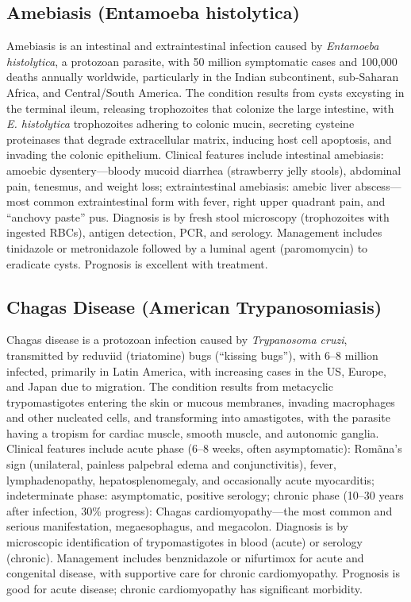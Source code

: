 \subsection{Amebiasis (Entamoeba histolytica)}
\label{sec:Amebiasis}
Amebiasis is an intestinal and extraintestinal infection caused by \textit{Entamoeba histolytica}, a protozoan parasite, with 50 million symptomatic cases and 100,000 deaths annually worldwide, particularly in the Indian subcontinent, sub-Saharan Africa, and Central/South America. The condition results from cysts excysting in the terminal ileum, releasing trophozoites that colonize the large intestine, with \textit{E. histolytica} trophozoites adhering to colonic mucin, secreting cysteine proteinases that degrade extracellular matrix, inducing host cell apoptosis, and invading the colonic epithelium. Clinical features include intestinal amebiasis: amoebic dysentery---bloody mucoid diarrhea (strawberry jelly stools), abdominal pain, tenesmus, and weight loss; extraintestinal amebiasis: amebic liver abscess---most common extraintestinal form with fever, right upper quadrant pain, and ``anchovy paste'' pus. Diagnosis is by fresh stool microscopy (trophozoites with ingested RBCs), antigen detection, PCR, and serology. Management includes tinidazole or metronidazole followed by a luminal agent (paromomycin) to eradicate cysts. Prognosis is excellent with treatment.

\subsection{Chagas Disease (American Trypanosomiasis)}
\label{sec:Chagas Disease}
Chagas disease is a protozoan infection caused by \textit{Trypanosoma cruzi}, transmitted by reduviid (triatomine) bugs (``kissing bugs''), with 6--8 million infected, primarily in Latin America, with increasing cases in the US, Europe, and Japan due to migration. The condition results from metacyclic trypomastigotes entering the skin or mucous membranes, invading macrophages and other nucleated cells, and transforming into amastigotes, with the parasite having a tropism for cardiac muscle, smooth muscle, and autonomic ganglia. Clinical features include acute phase (6--8 weeks, often asymptomatic): Romãna's sign (unilateral, painless palpebral edema and conjunctivitis), fever, lymphadenopathy, hepatosplenomegaly, and occasionally acute myocarditis; indeterminate phase: asymptomatic, positive serology; chronic phase (10--30 years after infection, 30\% progress): Chagas cardiomyopathy---the most common and serious manifestation, megaesophagus, and megacolon. Diagnosis is by microscopic identification of trypomastigotes in blood (acute) or serology (chronic). Management includes benznidazole or nifurtimox for acute and congenital disease, with supportive care for chronic cardiomyopathy. Prognosis is good for acute disease; chronic cardiomyopathy has significant morbidity.

